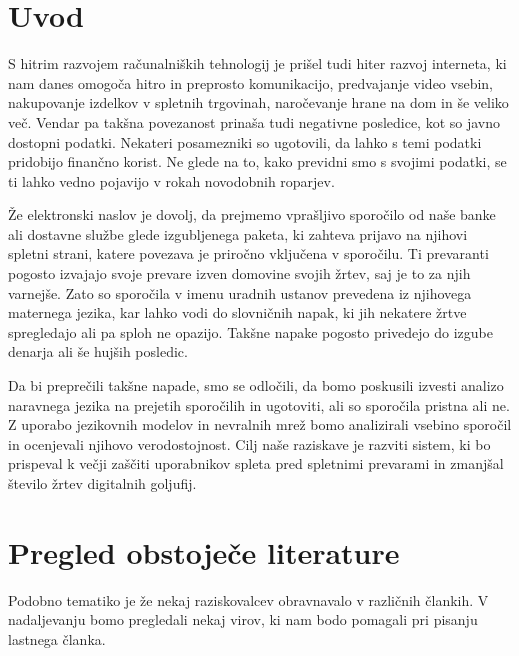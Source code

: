 \documentclass[sigconf,nonacm]{acmart}
\begin{document}

\maketitle

\section{Uvod}

S hitrim razvojem računalniških tehnologij je prišel tudi hiter razvoj interneta, ki nam danes omogoča hitro in preprosto komunikacijo, predvajanje video vsebin, nakupovanje izdelkov v spletnih trgovinah, naročevanje hrane na dom in še veliko več. Vendar pa takšna povezanost prinaša tudi negativne posledice, kot so javno dostopni podatki. Nekateri posamezniki so ugotovili, da lahko s temi podatki pridobijo finančno korist. Ne glede na to, kako previdni smo s svojimi podatki, se ti lahko vedno pojavijo v rokah novodobnih roparjev. 

Že elektronski naslov je dovolj, da prejmemo vprašljivo sporočilo od naše banke ali dostavne službe glede izgubljenega paketa, ki zahteva prijavo na njihovi spletni strani, katere povezava je priročno vključena v sporočilu. Ti prevaranti pogosto izvajajo svoje prevare izven domovine svojih žrtev, saj je to za njih varnejše. Zato so sporočila v imenu uradnih ustanov prevedena iz njihovega maternega jezika, kar lahko vodi do slovničnih napak, ki jih nekatere žrtve spregledajo ali pa sploh ne opazijo. Takšne napake pogosto privedejo do izgube denarja ali še hujših posledic.

Da bi preprečili takšne napade, smo se odločili, da bomo poskusili izvesti analizo naravnega jezika na prejetih sporočilih in ugotoviti, ali so sporočila pristna ali ne. Z uporabo jezikovnih modelov in nevralnih mrež bomo analizirali vsebino sporočil in ocenjevali njihovo verodostojnost. Cilj naše raziskave je razviti sistem, ki bo prispeval k večji zaščiti uporabnikov spleta pred spletnimi prevarami in zmanjšal število žrtev digitalnih goljufij.

\section{Pregled obstoječe literature}
Podobno tematiko je že nekaj raziskovalcev obravnavalo v različnih člankih. V nadaljevanju bomo pregledali nekaj virov, ki nam bodo pomagali pri pisanju lastnega članka.
\end{document}
